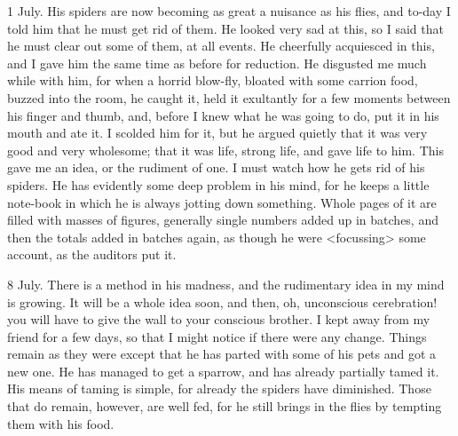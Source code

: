 \begin{diary}{1 July.}
His spiders are now becoming as great a nuisance as his flies, and to-day I told him that he must get rid of them. He looked very sad at this, so I said that he must clear out some of them, at all events. He cheerfully acquiesced in this, and I gave him the same time as before for reduction. He disgusted me much while with him, for when a horrid blow-fly, bloated with some carrion food, buzzed into the room, he caught it, held it exultantly for a few moments between his finger and thumb, and, before I knew what he was going to do, put it in his mouth and ate it. I scolded him for it, but he argued quietly that it was very good and very wholesome; that it was life, strong life, and gave life to him. This gave me an idea, or the rudiment of one. I must watch how he gets rid of his spiders. He has evidently some deep problem in his mind, for he keeps a little note-book in which he is always jotting down something. Whole pages of it are filled with masses of figures, generally single numbers added up in batches, and then the totals added in batches again, as though he were <focussing> some account, as the auditors put it.
\end{diary}
 
\begin{diary}{8 July.}
There is a method in his madness, and the rudimentary idea in my mind is growing. It will be a whole idea soon, and then, oh, unconscious cerebration! you will have to give the wall to your conscious brother. I kept away from my friend for a few days, so that I might notice if there were any change. Things remain as they were except that he has parted with some of his pets and got a new one. He has managed to get a sparrow, and has already partially tamed it. His means of taming is simple, for already the spiders have diminished. Those that do remain, however, are well fed, for he still brings in the flies by tempting them with his food.
\end{diary}
 
